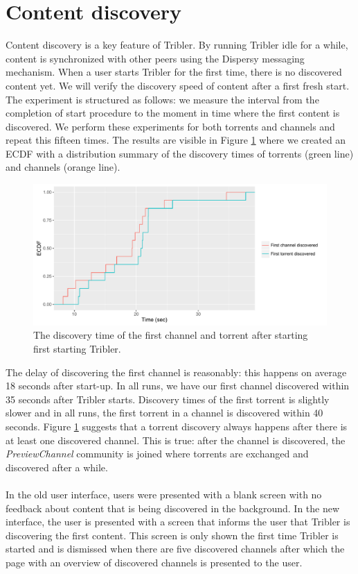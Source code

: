 \section{Content discovery}
\label{sec:content-discovery}
Content discovery is a key feature of Tribler. By running Tribler idle for a while, content is synchronized with other peers using the Dispersy messaging mechanism. When a user starts Tribler for the first time, there is no discovered content yet. We will verify the discovery speed of content after a first fresh start. The experiment is structured as follows: we measure the interval from the completion of start procedure to the moment in time where the first content is discovered. We perform these experiments for both torrents and channels and repeat this fifteen times. The results are visible in Figure \ref{fig:content_discovery_speed} where we created an ECDF with a distribution summary of the discovery times of torrents (green line) and channels (orange line).\\

\begin{figure}[!h]
	\centering
	\includegraphics[width=1.0\columnwidth]{images/experiments/content_discovery}
	\caption{The discovery time of the first channel and torrent after starting first starting Tribler.}
	\label{fig:content_discovery_speed}
\end{figure}

The delay of discovering the first channel is reasonably: this happens on average 18 seconds after start-up. In all runs, we have our first channel discovered within 35 seconds after Tribler starts. Discovery times of the first torrent is slightly slower and in all runs, the first torrent in a channel is discovered within 40 seconds. Figure \ref{fig:content_discovery_speed} suggests that a torrent discovery always happens after there is at least one discovered channel. This is true: after the channel is discovered, the \emph{PreviewChannel} community is joined where torrents are exchanged and discovered after a while.\\\\
In the old user interface, users were presented with a blank screen with no feedback about content that is being discovered in the background. In the new interface, the user is presented with a screen that informs the user that Tribler is discovering the first content. This screen is only shown the first time Tribler is started and is dismissed when there are five discovered channels after which the page with an overview of discovered channels is presented to the user.

